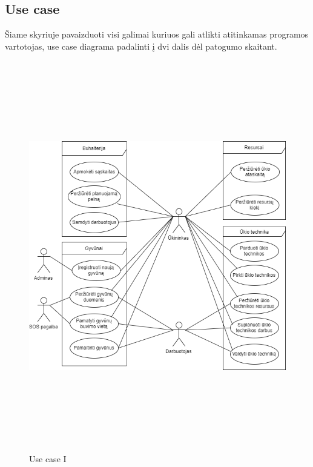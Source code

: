 \documentclass[oneside]{VUMIFPSkursinis}
\begin{document}
\subsection{Use case}
Šiame skyriuje pavaizduoti visi galimai kuriuos gali atlikti atitinkamas programos vartotojas, use case diagrama padalinti į dvi dalis dėl patogumo skaitant.
		\begin{figure}[H]
		\centering	
	\includegraphics[width=15cm,height=17cm,keepaspectratio]{ResursaiUseCase.png}
	\caption{Use case I}
	\label{fig:UseCaseFull}
\end{figure}
\end{document}
